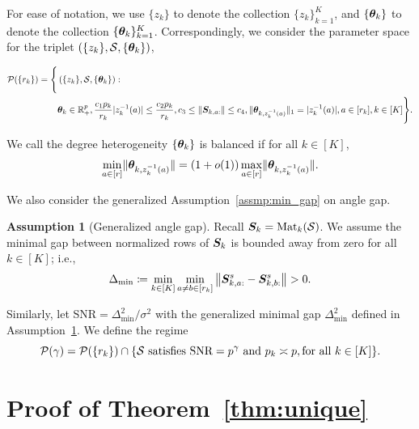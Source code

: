 \documentclass[lettersize,onecolumn,journal]{IEEEtran}
\theoremstyle{definition}
\theoremstyle{definition}
\newtheorem{assumption}{Assumption}
\newcommand{\of}[1]{\left(#1\right)}
\begin{document}
For ease of notation, we use $\{z_k\}$ to denote the collection $\{z_k\}_{k=1}^K$, and $\{\boldsymbol{\theta}_k\}$ to denote the collection $\{\boldsymbol{\theta}_k\}_{k=1}^K$. Correspondingly, we consider the parameter space for the triplet $\of{\{z_k\}, \tS, \{\mtheta_k\}}$,

\begin{align}
 \tP(\{r_k\}) = \Bigg\{ &\of{\{z_k\}, \tS, \{\mtheta_k\}}:\\
   & \mtheta_k \in\mathbb{R}^p_{+}, {c_1 p_k\over r_k} |z_k^{-1}(a)| \leq {c_2 p_k\over r_k}, c_3 \leq  \onorm{\mS_{k,a:}} \leq c_4 ,\onormSize{}{\mtheta_{k,z_k^{-1}(a)}}_1=|z_k^{-1}(a)|, a \in [r_k], k\in[K]\Bigg\}. \label{eq:general_family}
\end{align}


We call the degree heterogeneity $\{\boldsymbol{\theta}_k\}$ is balanced if for all $k \in [K]$,
\begin{equation}\label{eq:general_balanced}
    {\min_{a\in[r]} \onormSize{}{\mtheta_{k, z_k^{-1}(a)}}=\left(1+o(1)\right)\max_{a\in[r]}\onormSize{}{\mtheta_{k,z_k^{-1}(a)}}}.
\end{equation}

We also consider the generalized Assumption~\ref{assmp:min_gap} on angle gap.
\begin{assumption}[Generalized angle gap]\label{assmp:general_minimal_gap} Recall $\bm S_k=\text{Mat}_k(\mathcal{S})$. We assume the minimal gap between normalized rows of $\bm S_k$ is bounded away from zero for all $k\in[K]$; i.e.,
\begin{equation}
     \Delta_{\min} \coloneqq \min_{k \in [K]} \min_{a \neq b \in [r_k]} \left\lVert \bm S_{k,a:}^s - \bm S_{k, b:}^s \right\rVert > 0.
\end{equation}
\end{assumption}
Similarly, let $\text{SNR} = \Delta_{\min}^2/\sigma^2$ with the generalized minimal gap $\Delta_{\min}^2$ defined in Assumption~\ref{assmp:general_minimal_gap}. We define the regime
\begin{equation}
    \mathcal{P}(\gamma) = \mathcal{P} (\{r_k\}) \cap\{\mathcal{S} \text{ satisfies $\text{SNR} = p^{\gamma}$ and $p_k \asymp p, \text{for all }k \in [K]$} \}.
\end{equation}



\section*{Proof of Theorem~\ref{thm:unique}}
\end{document}
